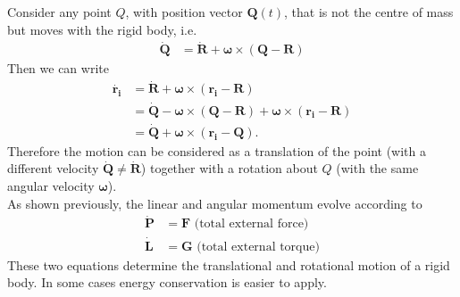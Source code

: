 \documentclass[a4paper]{article}
\begin{document}
Consider any point $Q$, with position vector $\mathbf{Q}\left(t\right)$, that is not the centre of mass but moves with the rigid body, i.e. 
\begin{equation*}
\begin{aligned}
\mathbf{\dot{Q}}&=\mathbf{\dot{R}}+\mathbf{\omega}\times\left(\mathbf{Q}-\mathbf{R}\right)
\end{aligned}
\end{equation*}
Then we can write
\begin{equation*}
\begin{aligned}
\mathbf{\dot{r_i}}&=\mathbf{\dot{R}}+\mathbf{\omega}\times\left(\mathbf{r_i}-\mathbf{R}\right)\\
&= \mathbf{\dot{Q}}-\mathbf{\omega}\times\left(\mathbf{Q}-\mathbf{R}\right)+\mathbf{\omega}\times\left(\mathbf{r_i}-\mathbf{R}\right)\\
&= \mathbf{\dot{Q}}+\mathbf{\omega}\times\left(\mathbf{r_i}-\mathbf{Q}\right).
\end{aligned}
\end{equation*}
Therefore the motion can be considered as a translation of the point (with a different velocity $\mathbf{\dot{Q}}\neq\mathbf{\dot{R}}$) together with a rotation about $Q$ (with the same angular velocity $\mathbf{\omega}$).\\

As shown previously, the linear and angular momentum evolve according to
\begin{equation*}
\begin{aligned}
\mathbf{\dot{P}}&=\mathbf{F} \text{  (total external force)}\\
\mathbf{\dot{L}}&=\mathbf{G} \text{  (total external torque)}
\end{aligned}
\end{equation*}
These two equations determine the translational and rotational motion of a rigid body. In some cases energy conservation is easier to apply.\\
\end{document}

